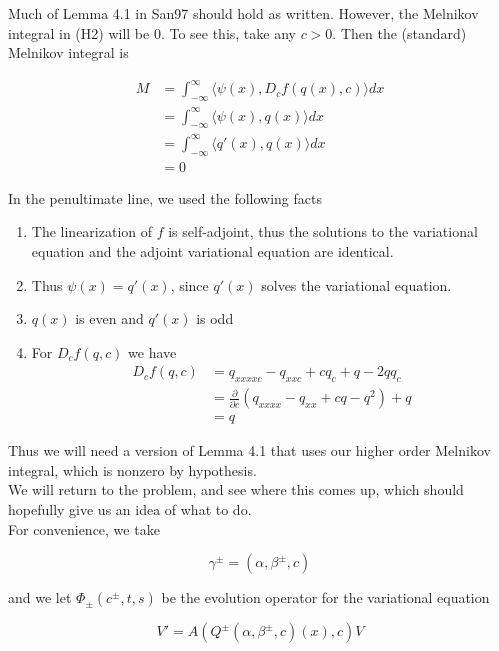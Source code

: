 \documentclass[12pt]{article}
\begin{document}
Much of Lemma 4.1 in San97 should hold as written. However, the Melnikov integral in (H2) will be 0. To see this, take any $c > 0$. Then the (standard) Melnikov integral is

\begin{align*}
M &= \int_{-\infty}^\infty \langle \psi(x), D_c f(q(x), c) \rangle dx \\
&= \int_{-\infty}^\infty \langle \psi(x), q(x) \rangle dx \\
&= \int_{-\infty}^\infty \langle q'(x), q(x) \rangle dx \\
&= 0
\end{align*}

In the penultimate line, we used the following facts

\begin{enumerate}

\item The linearization of $f$ is self-adjoint, thus the solutions to the variational equation and the adjoint variational equation are identical.
\item Thus $\psi(x) = q'(x)$, since $q'(x)$ solves the variational equation.
\item $q(x)$ is even and $q'(x)$ is odd
\item For $D_c f(q, c)$ we have
\begin{align*}
D_c f(q, c) &= q_{xxxxc} - q_{xxc} + c q_c + q - 2qq_c \\
&= \frac{\partial}{\partial c}(q_{xxxx} - q_{xx} + cq - q^2) + q \\
&= q
\end{align*}

\end{enumerate}

Thus we will need a version of Lemma 4.1 that uses our higher order Melnikov integral, which is nonzero by hypothesis. \\

We will return to the problem, and see where this comes up, which should hopefully give us an idea of what to do.\\

For convenience, we take 

\[
\gamma^\pm = (\alpha, \beta^\pm, c)
\]

and we let $\Phi_\pm(c^\pm, t, s)$ be the evolution operator for the variational equation

\begin{equation}
V' = A(Q^\pm(\alpha, \beta^\pm, c)(x), c) V
\end{equation}
\end{document}
